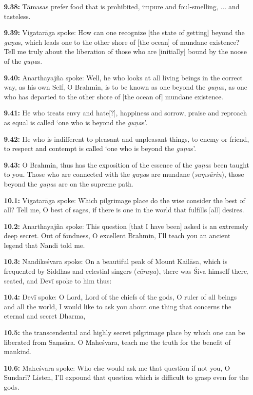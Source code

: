 \documentclass{article}
\newcommand{\vsnum}[1]{\textbf{#1}}
\newcommand{\skt}[1]{\textit{#1}}
\begin{document}
\vsnum{9.38: }Tāmasas prefer food that is prohibited, impure and foul-smelling,  ... and tasteless. 

\vsnum{9.39: }Vigatarāga spoke: How can one recognize [the state of getting] beyond the \skt{guṇa}s, which leads one to the other shore of [the ocean] of mundane existence? Tell me truly about the liberation of those who are [initially] bound by the noose of the \skt{guṇa}s.

\vsnum{9.40: }Anarthayajña spoke: Well, he who looks at all living beings in the correct way, as his own Self, O Brahmin, is to be known as one beyond the \skt{guṇa}s, as one who has departed to the other shore of [the ocean of] mundane existence.

\vsnum{9.41: }He who treats envy and hate[?], happiness and sorrow, praise and reproach as equal is called `one who is beyond the \skt{guṇa}s'.

\vsnum{9.42: }He who is indifferent to pleasant and unpleasant things, to enemy or friend, to respect and contempt is called `one who is beyond the \skt{guṇa}s'.

\vsnum{9.43: }O Brahmin, thus has the exposition of the essence of the \skt{guṇa}s been taught to you. Those who are connected with the \skt{guṇa}s are mundane (\skt{saṃsārin}), those beyond the \skt{guṇa}s are on the supreme path.


\vsnum{10.1: }Vigatarāga spoke: Which pilgrimage place do the wise consider the best of all? Tell me, O best of sages, if there is one in the world that fulfills [all] desires.

\vsnum{10.2: }Anarthayajña spoke: This question [that I have been] asked is an extremely deep secret. Out of fondness, O excellent Brahmin, I'll teach you an ancient legend that Nandi told me.

\vsnum{10.3: }Nandikeśvara spoke: On a beautiful peak of Mount Kailāsa, which is frequented by Siddhas and celestial singers (\skt{cāraṇa}), there was Śiva himself there, seated, and Devī spoke to him thus:

\vsnum{10.4: }Devī spoke: O Lord, Lord of the chiefs of the gods, O ruler of all beings and all the world, I would like to ask you about one thing that concerns the eternal and secret Dharma,

\vsnum{10.5: }the transcendental and highly secret pilgrimage place by which one can be liberated from Saṃsāra. O Maheśvara, teach me the truth for the benefit of mankind.

\vsnum{10.6: }Maheśvara spoke: Who else would ask me that question if not you, O Sundarī? Listen, I'll expound that question which is difficult to grasp even for the gods.
\end{document}
